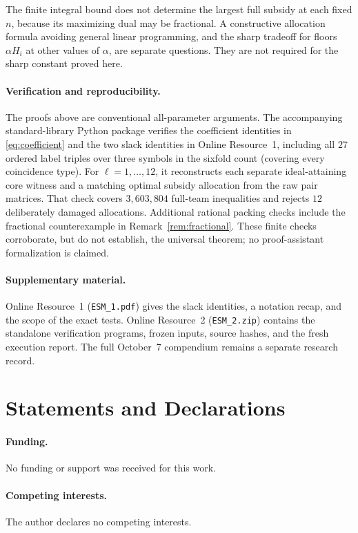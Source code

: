 \documentclass[11pt]{article}
\theoremstyle{remark}
\begin{document}
The finite integral bound does not determine the largest full subsidy at
each fixed $n$, because its maximizing dual may be fractional. A constructive
allocation formula avoiding general linear programming, and the sharp
tradeoff for floors $\alpha H_i$ at other values of $\alpha$, are separate
questions. They are not required for the sharp constant proved here.

\paragraph{Verification and reproducibility.}
The proofs above are conventional all-parameter arguments. The accompanying
standard-library Python package verifies the coefficient identities in
\eqref{eq:coefficient} and the two slack identities in Online Resource~1,
including all $27$ ordered label triples over three symbols in the sixfold
count (covering every coincidence type).
For $\ell=1,\ldots,12$, it reconstructs each separate ideal-attaining
core witness and a matching optimal subsidy allocation from the raw pair
matrices. That check covers $3{,}603{,}804$ full-team inequalities and rejects
$12$ deliberately damaged allocations. Additional rational packing checks
include the fractional counterexample in Remark~\ref{rem:fractional}.
These finite checks corroborate, but do not establish, the universal theorem;
no proof-assistant formalization is claimed.

\paragraph{Supplementary material.}
Online Resource~1 (\texttt{ESM\_1.pdf}) gives the slack identities, a notation
recap, and the scope of the exact tests. Online Resource~2
(\texttt{ESM\_2.zip}) contains the standalone verification programs, frozen
inputs, source hashes, and the fresh execution report. The full October~7
compendium remains a separate research record.

\section*{Statements and Declarations}
\paragraph{Funding.} No funding or support was received for this work.
\paragraph{Competing interests.} The author declares no competing interests.
\end{document}
